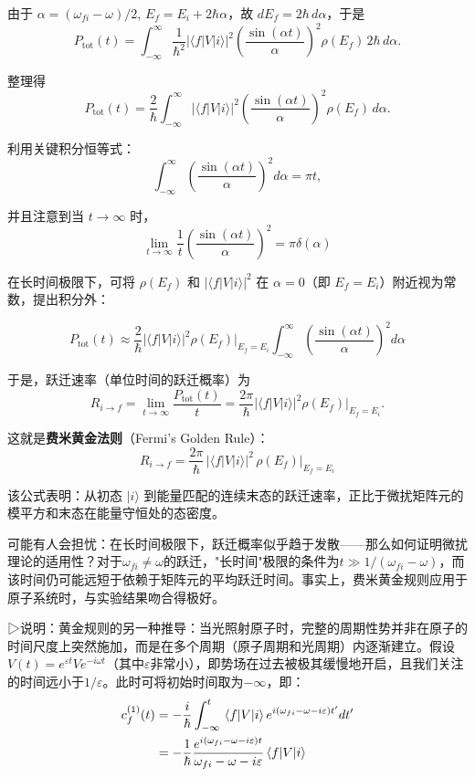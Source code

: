 由于 $\alpha=(\omega_{fi}-\omega)/2$,  $E_f = E_i + 2\hbar \alpha$，故 $dE_f = 2\hbar\, d\alpha$，于是
\begin{equation*}
	P_{\text{tot}}(t) = \int_{-\infty}^{\infty} \frac{1}{\hbar^2}|\langle f| V |i\rangle|^2 \left( \frac{\sin(\alpha t)}{\alpha} \right)^2 \rho(E_f)\, 2\hbar\, d\alpha.
\end{equation*}

整理得
\begin{equation}
	P_{\text{tot}}(t) = \frac{2}{\hbar} \int_{-\infty}^{\infty} |\langle f| V |i\rangle|^2 \left( \frac{\sin(\alpha t)}{\alpha} \right)^2 \rho(E_f)\, d\alpha.
\end{equation}

利用关键积分恒等式：
\[
\int_{-\infty}^{\infty} \left( \frac{\sin(\alpha t)}{\alpha} \right)^2 d\alpha = \pi t,
\]

并且注意到当 $t \to \infty$ 时，
\begin{equation*}
	\lim_{t\to\infty}\frac{1}{t}\left(\frac{\sin(\alpha t)}{\alpha}\right)^2=\pi\delta(\alpha)
\end{equation*}

在长时间极限下，可将 $\rho(E_f)$ 和 $|\langle f| V |i\rangle|^2$ 在 $\alpha = 0$（即 $E_f = E_i$）附近视为常数，提出积分外：

\[
P_{\text{tot}}(t) \approx \frac{2}{\hbar} |\langle f| V |i\rangle|^2 \rho(E_f) \bigg|_{E_f = E_i} \int_{-\infty}^{\infty} \left( \frac{\sin(\alpha t)}{\alpha} \right)^2 d\alpha
\]

于是，跃迁速率（单位时间的跃迁概率）为
\[
R_{i \to f} = \lim_{t \to \infty} \frac{P_{\text{tot}}(t)}{t}
= \frac{2\pi}{\hbar} |\langle f| V |i\rangle|^2 \rho(E_f) \Big|_{E_f = E_i}.
\]

这就是\textbf{费米黄金法则}（Fermi's Golden Rule）：
\begin{equation}
	\boxed{
		R_{i \to f} = \frac{2\pi}{\hbar} \, |\langle f| V |i\rangle|^2 \, \rho(E_f) \Big|_{E_f = E_i}
	}
\end{equation}

该公式表明：从初态 $|i\rangle$ 到能量匹配的连续末态的跃迁速率，正比于微扰矩阵元的模平方和末态在能量守恒处的态密度。

可能有人会担忧：在长时间极限下，跃迁概率似乎趋于发散——那么如何证明微扰理论的适用性？对于$\omega_{fi}\neq\omega$的跃迁，"长时间"极限的条件为$t\gg1/(\omega_{fi}-\omega)$，而该时间仍可能远短于依赖于矩阵元的平均跃迁时间。事实上，费米黄金规则应用于原子系统时，与实验结果吻合得极好。

▷说明：黄金规则的另一种推导：当光照射原子时，完整的周期性势并非在原子的时间尺度上突然施加，而是在多个周期（原子周期和光周期）内逐渐建立。假设$V(t)=e^{\varepsilon t}Ve^{-i\omega t}$（其中$\varepsilon$非常小），即势场在过去被极其缓慢地开启，且我们关注的时间远小于$1/\varepsilon$。此时可将初始时间取为$-\infty$，即：
\begin{align*}
	c_f^{(1)}(t)&=-\frac{i}{\hbar}\int_{-\infty}^t \matrixel{f}{V}{i}e^{i(\omega_{fi}-\omega-i\varepsilon)t'}dt'\\
	&=-\frac{1}{\hbar}\frac{e^{i(\omega_{fi}-\omega-i\varepsilon)t}}{\omega_{fi}-\omega-i\varepsilon}\matrixel{f}{V}{i}
\end{align*}

